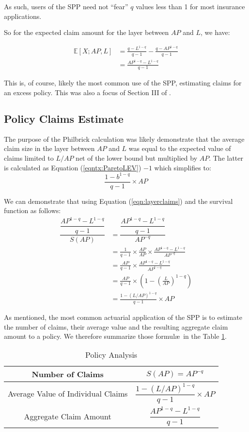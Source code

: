 As such, users of the SPP need not ``fear'' $q$ values less than 1 for most insurance applications.

So for the expected claim amount for the layer between $AP$ and $L$, we have:

\begin{align}
\mathbb{E}[X;AP, L] &= \frac{q - L^{1-q}}{q-1} - \frac{q - AP^{1-q}}{q-1}\nonumber \\
&= \frac{AP^{1-q} - L^{1-q}}{q-1}\label{eqn:layerclaims}
\end{align}

This is, of course, likely the most common use of the SPP, estimating claims for an excess policy. This was also a focus of Section III of \philbrick. 

\subsection{Policy Claims Estimate}
The purpose of the Philbrick calculation was likely demonstrate that the average claim size in the layer between $AP$ and $L$ was equal to the expected value of claims limited to $L / AP$ net of the lower bound but multiplied by $AP$. The latter is calculated as Equation (\ref{eqntx:ParetoLEV}) $- 1$ which simplifies to:
\begin{equation}
\frac{1 - b^{1-q}}{q-1} \times AP
\end{equation}

We can demonstrate that using Equation (\ref{eqn:layerclaims}) and the survival function as follows:
\begin{align}
\dfrac{\dfrac{AP^{1-q} - L^{1-q}}{q-1}}{S(AP)} &= 
\dfrac{\dfrac{AP^{1-q} - L^{1-q}}{q-1}}{AP^{-q}}\nonumber\\
	&= \frac{1}{q-1} \times \frac{AP}{AP} \times \frac{AP^{1-q} - L^{1-q}}{AP^{-q}}\nonumber\\
	&= \frac{AP}{q-1} \times \frac{AP^{1-q} - L^{1-q}}{AP^{1-q}}\nonumber\\
	&= \frac{AP}{q-1} \times \left(1 - \left(\frac{L}{AP}\right)^{1-q}\right)\nonumber\\
	&= \frac{1 - (L/AP)^{1-q}}{q-1} \times AP
\end{align}

As mentioned, the most common actuarial application of the SPP is to estimate the number of claims, their average value and the resulting aggregate claim amount to a policy. We therefore summarize those formul\ae~in the Table \ref{tbl:PolicyFormulas}.
\begin{table}[h!]
	\centering
	\begin{tabular}[h]{cc}
		\toprule
		Number of Claims & $S(AP) = AP^{-q}$\\ \midrule
		Average Value of Individual Claims & $\dfrac{1 - (L/AP)^{1-q}}{q-1} \times AP$\\ \midrule
		Aggregate Claim Amount & $\dfrac{AP^{1-q} - L^{1-q}}{q-1}$\\
		\bottomrule
	\end{tabular}
	\caption{Policy Analysis}\label{tbl:PolicyFormulas}			
\end{table}



